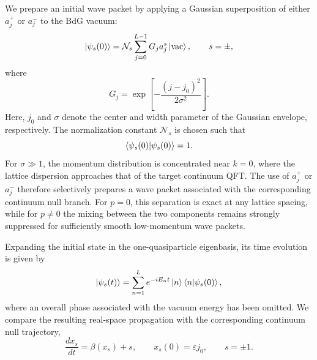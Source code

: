 \documentclass[reprint,amsmath,amssymb,aps,prb,floatfix,showkeys,superscriptaddress]{revtex4-2}
\begin{document}
We prepare an initial wave packet by applying a Gaussian
superposition of either $a_j^+$ or $a_j^-$ to the BdG vacuum:
\begin{equation}
  \ket{\psi_s(0)}
  =
  \mathcal{N}_s
  \sum_{j=0}^{L-1}
  G_j a_j^s
  \ket{\mathrm{vac}},
  \qquad
  s=\pm,
  \label{eq:initial_state_a}
\end{equation}
where
\begin{equation}
  G_j
  =
  \exp\left[
    -\frac{(j-j_0)^2}{2\sigma^2}
  \right].
  \label{eq:Gaussian_envelope}
\end{equation}
Here, $j_0$ and $\sigma$ denote the center and width parameter of
the Gaussian envelope, respectively. The normalization constant
$\mathcal{N}_s$ is chosen such that
\begin{equation}
  \braket{\psi_s(0)|\psi_s(0)}=1.
  \label{eq:initial_state_normalization}
\end{equation}
For $\sigma\gg1$, the momentum distribution is concentrated near
$k=0$, where the lattice dispersion approaches that of the
target continuum QFT. The use of $a_j^+$ or $a_j^-$ therefore
selectively prepares a wave packet associated with the corresponding
continuum null branch. For $p=0$, this separation is exact at any
lattice spacing, while for $p\neq0$ the mixing between the two
components remains strongly suppressed for sufficiently smooth
low-momentum wave packets.

Expanding the initial state in the one-quasiparticle eigenbasis, its
time evolution is given by
\begin{equation}
  \ket{\psi_s(t)}
  =
  \sum_{n=1}^{L}
  e^{-iE_nt}
  \ket{n}
  \braket{n|\psi_s(0)},
  \label{eq:time_evolved_state}
\end{equation}
where an overall phase associated with the vacuum energy has been
omitted. We compare the resulting real-space propagation with the
corresponding continuum null trajectory,
\begin{equation}
  \frac{dx_s}{dt}
  =
  \beta(x_s)+s,
  \qquad
  x_s(0)=\varepsilon j_0,
  \qquad
  s=\pm1.
  \label{eq:null_trajectory}
\end{equation}
\end{document}
